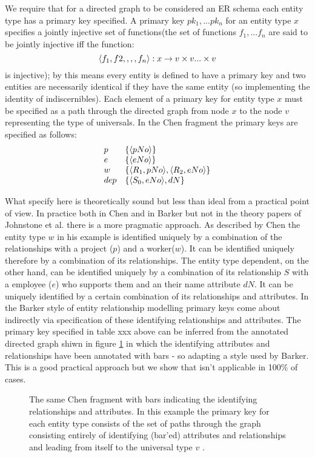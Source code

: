 \documentclass[10pt,a4paper]{article}
\newcommand{\set}[1]{\left\{#1\right\}}
\newcommand{\veee}{v}
\begin{document}
We require that 
for a directed graph to be considered an ER schema each entity type has a primary
key specified. 
A primary key $pk_1,...pk_n$ for an entity type $x$ specifies a jointly injective set of functions(the set of functions $f_1,...f_n$ are said to be jointly injective iff the function:
$$
\tuple{f_1,f2,,,,f_n}: x \morph \veee \times \veee ... \times \veee
$$
is injective); by this means every entity is defined to have a primary key and two entities are necessarily identical if they have the same entity (so implementing the identity of indiscernibles). Each element of a primary key for entity type $x$ must be specified as a path through the directed graph from node $x$ to the node $\veee$ representing the type of universals.  In the Chen fragment the primary keys are specified as follows:
$$
\begin{array}{l l}
p & \set{\tuple{pNo}} \\
e & \set{\tuple{eNo}} \\
w & \set{\tuple{R_1,pNo},\tuple{R_2,eNo}} \\
dep & \set{\tuple{S_0,eNo},dN}
\end{array}
$$



What specify here is theoretically sound but less than ideal from a practical point of view.  In practice both in Chen and in Barker but not in the theory papers of Johnstone et al. there is a more pragmatic approach. As described by Chen the entity type 
$w$ in his example is identified uniquely by a combination of the relationships with a project ($p$) and a worker($w$). It can be identified uniquely therefore by a combination of its relationships. The entity type dependent, on the other hand, can
be identified uniquely by a combination of its relationship $S$ with a employee ($e$) 
who supports them and an their name attribute $dN$. It can be uniquely identified 
by a certain combination of its relationships and attributes.   In the Barker 
style of entity relationship modelling primary keys come about indirectly via specification of these identifying relationships and attributes. 
The primary key specified in table xxx above can be inferred from the annotated directed graph shiwn 
in figure \ref{chenfragment} in which the identifying attributes and relationships
have been annotated with bars - so adapting a style used by Barker.
This is a good practical approach but we show that isn't applicable in 100\% of cases.
\begin{figure} [H]  %
\begin{center}
\barstrue

\end{center}
\caption{The same Chen fragment with bars indicating the identifying relationships and attributes. In this example the primary key for each entity type consists of the set of paths through the graph consisting entirely
of identifying (bar'ed) attributes and relationships and leading from itself to the universal type $\veee$ .}
\label{chenfragment}
\end{figure}
\end{document}

